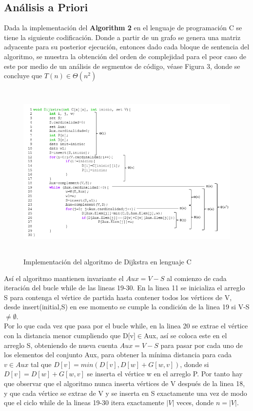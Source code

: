\documentclass[12pt,twoside]{article}
\begin{document}
    \subsection{An\'alisis a Priori}
    Dada la implementaci\'on del {\bf Algorithm 2} en el lenguaje de programaci\'on C se tiene la siguiente codificaci\'on. Donde a partir de un grafo se genera una matriz adyacente para su posterior ejecuci\'on, entonces dado cada bloque de sentencia del algoritmo, se muestra la obtenci\'on del orden de complejidad para el peor caso de este por medio de un an\'alisis de segmentos de c\'odigo, véase Figura 3, donde se concluye que $T(n)\in\Theta(n^{2})$
    \begin{figure}[H]
        \centering
        \includegraphics[height=9cm]{imagenes/AD.png}
        \caption{Implementaci\'on del algoritmo de Dijkstra en lenguaje C}
    \end{figure}
    As\'i el algoritmo mantienen invariante el $Aux=V-S$ al comienzo de cada iteraci\'on del bucle while de las lineas 19-30. En la linea 11 se inicializa el arreglo S para contenga el v\'ertice de partida hasta contener todos los v\'ertices de V, desde insert(initial,S) en ese momento se cumple la condici\'on de la linea 19 si V-S$\neq\emptyset$.\\
    
    Por lo que cada vez que pasa por el bucle while, en la linea 20 se extrae el v\'ertice con la distancia menor cumpliendo que D[v]$\in$Aux, as\'i se coloca este en el arreglo S, obteniendo de nueva cuenta $Aux=V-S$ para pasar por cada uno de los elementos del conjunto Aux, para obtener la m\'inima distancia para cada $v\in Aux$ tal que $D[v]=min(D[v], D[w]+G[w,v])$, donde si $D[v]=D[w]+G[w,v]$ se inserta el v\'ertice w en el arreglo P. Por tanto hay que observar que el algoritmo nunca inserta v\'ertices de V despu\'es de la linea 18, y que cada v\'ertice se extrae de V y se inserta en S exactamente una vez de modo que el ciclo while de la lineas 19-30 itera exactamente $|V|$ veces, donde $n=|V|$.\\
    
\end{document}
